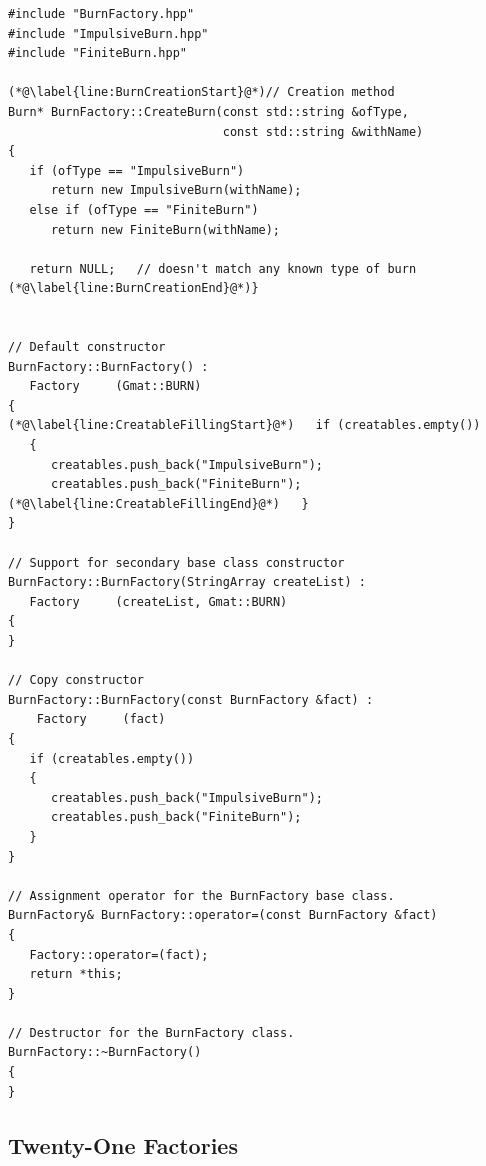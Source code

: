 \begin{lstlisting}[caption={Complete Implementation of the BurnFactory},
label={listing:BurnFactory}]
#include "BurnFactory.hpp"
#include "ImpulsiveBurn.hpp"
#include "FiniteBurn.hpp"

(*@\label{line:BurnCreationStart}@*)// Creation method
Burn* BurnFactory::CreateBurn(const std::string &ofType,
                              const std::string &withName)
{
   if (ofType == "ImpulsiveBurn")
      return new ImpulsiveBurn(withName);
   else if (ofType == "FiniteBurn")
      return new FiniteBurn(withName);

   return NULL;   // doesn't match any known type of burn
(*@\label{line:BurnCreationEnd}@*)}


// Default constructor
BurnFactory::BurnFactory() :
   Factory     (Gmat::BURN)
{
(*@\label{line:CreatableFillingStart}@*)   if (creatables.empty())
   {
      creatables.push_back("ImpulsiveBurn");
      creatables.push_back("FiniteBurn");
(*@\label{line:CreatableFillingEnd}@*)   }
}

// Support for secondary base class constructor
BurnFactory::BurnFactory(StringArray createList) :
   Factory     (createList, Gmat::BURN)
{
}

// Copy constructor
BurnFactory::BurnFactory(const BurnFactory &fact) :
    Factory     (fact)
{
   if (creatables.empty())
   {
      creatables.push_back("ImpulsiveBurn");
      creatables.push_back("FiniteBurn");
   }
}

// Assignment operator for the BurnFactory base class.
BurnFactory& BurnFactory::operator=(const BurnFactory &fact)
{
   Factory::operator=(fact);
   return *this;
}

// Destructor for the BurnFactory class.
BurnFactory::~BurnFactory()
{
}
\end{lstlisting}
\lstset{numbers=none}

\subsection{\label{section:TwentyOneFactories}Twenty-One Factories}

